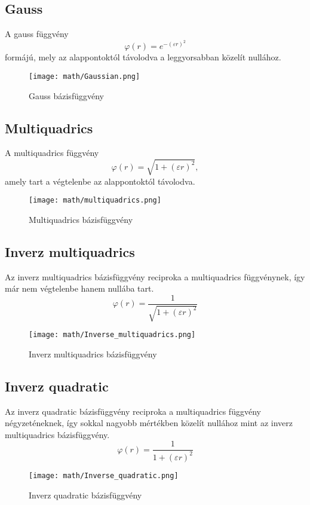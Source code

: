 		\subsection{Gauss} %
			A gauss függvény
			\[\varphi(r) = e^{-(\varepsilon r)^2}\]
			formájú, mely az alappontoktól távolodva a leggyorsabban közelít nullához.
			\begin{figure}[ht]
				\centering
				\texttt{[image: math/Gaussian.png]}
				\caption{Gauss bázisfüggvény}
			\end{figure} 
		\newpage
		\subsection{Multiquadrics}
			A multiquadrics függvény
			\[\varphi(r) = \sqrt{1 + (\varepsilon r)^2},\]
			amely tart a végtelenbe az alappontoktól távolodva.
			\begin{figure}[ht]
				\centering
				\texttt{[image: math/multiquadrics.png]}
				\caption{Multiquadrics bázisfüggvény}
			\end{figure} 
		
		
		\subsection{Inverz multiquadrics}
			Az inverz multiquadrics bázisfüggvény reciproka a multiquadrics függvénynek, így már nem végtelenbe hanem nullába tart.
			\[\varphi(r) = \dfrac{1}{\sqrt{1 + (\varepsilon r)^2}}\]
		
			\begin{figure}[ht]
				\centering
				\texttt{[image: math/Inverse\_multiquadrics.png]}
				\caption{Inverz multiquadrics bázisfüggvény}
			\end{figure}
			
		\subsection{Inverz quadratic}
		
			Az inverz quadratic bázisfüggvény reciproka a multiquadrics függvény négyzeténeknek, így sokkal nagyobb mértékben közelít nullához mint az inverz multiquadrics bázisfüggvény.		
			\[\varphi(r) = \dfrac{1}{1+(\varepsilon r)^2}\]
			
			\begin{figure}[ht]
				\centering
				\texttt{[image: math/Inverse\_quadratic.png]}
				\caption{Inverz quadratic bázisfüggvény}
			\end{figure}
		
